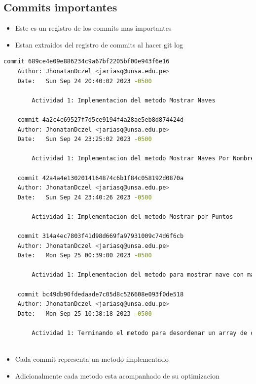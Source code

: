 \documentclass{article}
\begin{document}
        \subsection{Commits importantes}
        \begin{itemize}
            \item Este es un registro de los commits mas importantes
            \item Estan extraidos del registro de commits al hacer git log
        \end{itemize}
        \begin{lstlisting}[language=bash, caption={Commits}]
    commit 689ce4e09e886234c9a67bf2205bf00e943f6e16
    Author: JhonatanDczel <jariasq@unsa.edu.pe>
    Date:   Sun Sep 24 20:40:02 2023 -0500
    
        Actividad 1: Implementacion del metodo Mostrar Naves
    
    commit 4a2c4c69527f7d5ce9194f4a28ae5eb8d874424d
    Author: JhonatanDczel <jariasq@unsa.edu.pe>
    Date:   Sun Sep 24 23:25:02 2023 -0500
    
        Actividad 1: Implementacion del metodo Mostrar Naves Por Nombre
    
    commit 42a4a4e1302014164874c6b1f84c058192d0870a
    Author: JhonatanDczel <jariasq@unsa.edu.pe>
    Date:   Sun Sep 24 23:40:26 2023 -0500
    
        Actividad 1: Implementacion del metodo Mostrar por Puntos
    
    commit 314a4ec7803f41d98d669fa97931009c74d6f6cb
    Author: JhonatanDczel <jariasq@unsa.edu.pe>
    Date:   Mon Sep 25 00:39:00 2023 -0500
    
        Actividad 1: Implementacion del metodo para mostrar nave con mayor puntaje
    
    commit bc49db90fdedaade7c05d8c526608e093f0de518
    Author: JhonatanDczel <jariasq@unsa.edu.pe>
    Date:   Mon Sep 25 10:38:18 2023 -0500
    
        Actividad 1: Terminando el metodo para desordenar un array de objetos aleatoriamente
    

        \end{lstlisting}
        \begin{itemize}
            \item Cada commit representa un metodo implementado
            \item Adicionalmente cada metodo esta acompanhado de su optimizacion
        \end{itemize}
\end{document}
